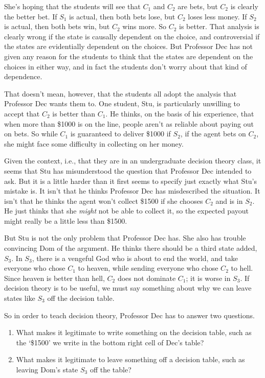 \documentclass[11pt,]{book}
\providecommand{\tightlist}{%
  \setlength{\itemsep}{0pt}\setlength{\parskip}{0pt}}
\begin{document}
She's hoping that the students will see that \(C_1\) and \(C_2\) are bets, but \(C_2\) is clearly the better bet. If \(S_1\) is actual, then both bets lose, but \(C_2\) loses less money. If \(S_2\) is actual, then both bets win, but \(C_2\) wins more. So \(C_2\) is better. That analysis is clearly wrong if the state is causally dependent on the choice, and controversial if the states are evidentially dependent on the choices. But Professor Dec has not given any reason for the students to think that the states are dependent on the choices in either way, and in fact the students don't worry about that kind of dependence.

That doesn't mean, however, that the students all adopt the analysis that Professor Dec wants them to. One student, Stu, is particularly unwilling to accept that \(C_2\) is better than \(C_1\). He thinks, on the basis of his experience, that when more than \$1000 is on the line, people aren't as reliable about paying out on bets. So while \(C_1\) is guaranteed to deliver \$1000 if \(S_2\), if the agent bets on \(C_2\), she might face some difficulty in collecting on her money.

Given the context, i.e., that they are in an undergraduate decision theory class, it seems that Stu has misunderstood the question that Professor Dec intended to ask. But it is a little harder than it first seems to specify just exactly what Stu's mistake is. It isn't that he thinks Professor Dec has misdescribed the situation. It isn't that he thinks the agent won't collect \$1500 if she chooses \(C_2\) and is in \(S_2\). He just thinks that she \emph{might} not be able to collect it, so the expected payout might really be a little less than \$1500.

But Stu is not the only problem that Professor Dec has. She also has trouble convincing Dom of the argument. He thinks there should be a third state added, \(S_3\). In \(S_3\), there is a vengeful God who is about to end the world, and take everyone who chose \(C_1\) to heaven, while sending everyone who chose \(C_2\) to hell. Since heaven is better than hell, \(C_2\) does not dominate \(C_1\); it is worse in \(S_3\). If decision theory is to be useful, we must say something about why we can leave states like \(S_3\) off the decision table.

So in order to teach decision theory, Professor Dec has to answer two questions.

\begin{enumerate}
\def\labelenumi{\arabic{enumi}.}
\tightlist
\item
  What makes it legitimate to write something on the decision table, such as the `\$1500' we write in the bottom right cell of Dec's table?
\item
  What makes it legitimate to leave something off a decision table, such as leaving Dom's state \(S_3\) off the table?
\end{enumerate}
\end{document}
